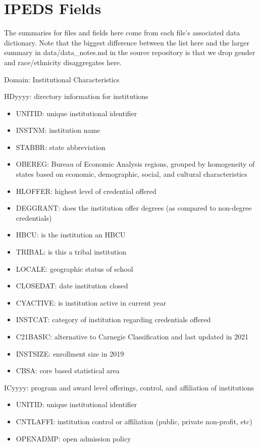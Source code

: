 \documentclass[sigconf, authorversion, nonacm]{acmart}
\begin{document}
\appendix

\section{IPEDS Fields}
    The summaries for files and fields here come from each file's associated data dictionary. Note that the biggest difference between the list here and the larger summary in data/data\_notes.md in the source repository is that we drop gender and race/ethnicity disaggregates here.

    Domain: Institutional Characteristics

    HDyyyy: directory information for institutions

    \begin{itemize}
        \item UNITID: unique institutional identifier
        \item INSTNM: institution name
        \item STABBR: state abbreviation
        \item OBEREG: Bureau of Economic Analysis regions, grouped by homogeneity of states based on economic, demographic, social, and cultural characteristics
        \item HLOFFER: highest level of credential offered
        \item DEGGRANT: does the institution offer degrees (as compared to non-degree credentials)
        \item HBCU: is the institution an HBCU
        \item TRIBAL: is this a tribal institution
        \item LOCALE: geographic status of school
        \item CLOSEDAT: date institution closed
        \item CYACTIVE: is institution active in current year
        \item INSTCAT: category of institution regarding credentials offered
        \item C21BASIC: alternative to Carnegie Classification and last updated in 2021
        \item INSTSIZE: enrollment size in 2019
        \item CBSA: core based statistical area
    \end{itemize}

    ICyyyy: program and award level offerings, control, and affiliation of institutions

    \begin{itemize}
        \item UNITID: unique institutional identifier
        \item CNTLAFFI: institution control or affiliation (public, private non-profit, etc)
        \item OPENADMP: open admission policy
    \end{itemize}
\end{document}
